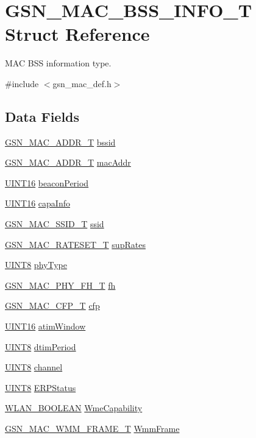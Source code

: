 \hypertarget{a00111}{
\section{GSN\_\-MAC\_\-BSS\_\-INFO\_\-T Struct Reference}
\label{a00111}
}


MAC BSS information type.  




{\ttfamily \#include $<$gsn\_\-mac\_\-def.h$>$}

\subsection*{Data Fields}
\begin{DoxyCompactItemize}
\item 
\hyperlink{a00416}{GSN\_\-MAC\_\-ADDR\_\-T} \hyperlink{a00111_a0c8072b3bb52f68906a0aacd382de7c2}{bssid}
\item 
\hyperlink{a00416}{GSN\_\-MAC\_\-ADDR\_\-T} \hyperlink{a00111_a80d1ca7fb5197906e82d15cda17d3c41}{macAddr}
\item 
\hyperlink{a00660_ga09f1a1fb2293e33483cc8d44aefb1eb1}{UINT16} \hyperlink{a00111_ad8457bb69452cbc0b2d065ceb377d03d}{beaconPeriod}
\item 
\hyperlink{a00660_ga09f1a1fb2293e33483cc8d44aefb1eb1}{UINT16} \hyperlink{a00111_a93b70bbe7c4ccf4b9191d92dc739c6ea}{capaInfo}
\item 
\hyperlink{a00417}{GSN\_\-MAC\_\-SSID\_\-T} \hyperlink{a00111_a1bc7788a828e29446580aa10a5ac2932}{ssid}
\item 
\hyperlink{a00125}{GSN\_\-MAC\_\-RATESET\_\-T} \hyperlink{a00111_ae8f1cc25d29a229c47940e7330b99ffc}{supRates}
\item 
\hyperlink{a00660_gab27e9918b538ce9d8ca692479b375b6a}{UINT8} \hyperlink{a00111_af9a21f0a566cd662139f84bfaf75d662}{phyType}
\item 
\hyperlink{a00120}{GSN\_\-MAC\_\-PHY\_\-FH\_\-T} \hyperlink{a00111_acd316070651a9808dda1a0581beaf798}{fh}
\item 
\hyperlink{a00112}{GSN\_\-MAC\_\-CFP\_\-T} \hyperlink{a00111_a6cf19925453191cd0f21e42cbac86eb7}{cfp}
\item 
\hyperlink{a00660_ga09f1a1fb2293e33483cc8d44aefb1eb1}{UINT16} \hyperlink{a00111_aeb2ce2278c2e879a8988c58d5f7bb606}{atimWindow}
\item 
\hyperlink{a00660_gab27e9918b538ce9d8ca692479b375b6a}{UINT8} \hyperlink{a00111_a299cd846e383cf8f77d0c2e71083caba}{dtimPeriod}
\item 
\hyperlink{a00660_gab27e9918b538ce9d8ca692479b375b6a}{UINT8} \hyperlink{a00111_a52d69a3bd7bdfdfc6f9e40f4962c575d}{channel}
\item 
\hyperlink{a00660_gab27e9918b538ce9d8ca692479b375b6a}{UINT8} \hyperlink{a00111_aa2397e8906c266c40c0558894c4be287}{ERPStatus}
\item 
\hyperlink{a00642_ga7fb691c78d3a1046fa998bae1560e1a5}{WLAN\_\-BOOLEAN} \hyperlink{a00111_a21329babf9e9d1788fb070dd700305e0}{WmeCapability}
\item 
\hyperlink{a00136}{GSN\_\-MAC\_\-WMM\_\-FRAME\_\-T} \hyperlink{a00111_a6e19d8a2da8f80de97e4acdb50ab2b7d}{WmmFrame}
\end{DoxyCompactItemize}


